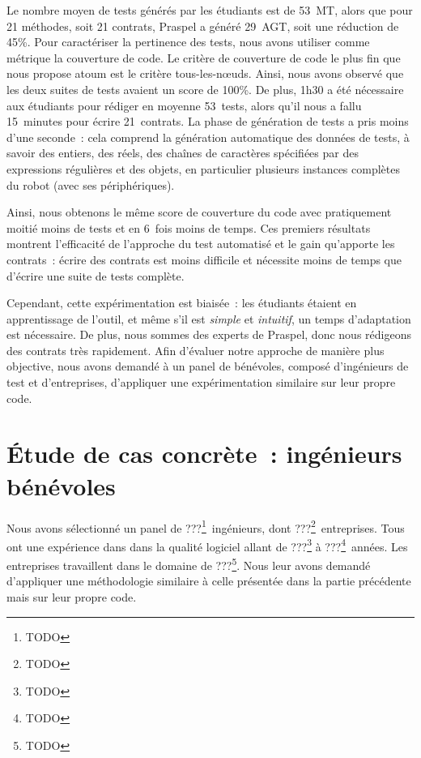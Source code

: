 Le nombre moyen de tests générés par les étudiants est de 53~MT, alors que pour
21 méthodes, soit 21 contrats, Praspel a généré 29~AGT, soit une réduction de
45\%. Pour caractériser la pertinence des tests, nous avons utiliser comme
métrique la couverture de code. Le critère de couverture de code le plus fin que
nous propose atoum est le critère tous-les-nœuds. Ainsi, nous avons observé que
les deux suites de tests avaient un score de 100\%. De plus, 1h30 a été
nécessaire aux étudiants pour rédiger en moyenne 53~tests, alors qu'il nous a
fallu 15~minutes pour écrire 21~contrats.  La phase de génération de tests a
pris moins d'une seconde~: cela comprend la génération automatique des données
de tests, à savoir des entiers, des réels, des chaînes de caractères spécifiées
par des expressions régulières et des objets, en particulier plusieurs instances
complètes du robot (avec ses périphériques).

Ainsi, nous obtenons le même score de couverture du code avec pratiquement
moitié moins de tests et en 6~fois moins de temps. Ces premiers résultats
montrent l'efficacité de l'approche du test automatisé et le gain qu'apporte les
contrats~: écrire des contrats est moins difficile et nécessite moins de temps
que d'écrire une suite de tests complète.

Cependant, cette expérimentation est biaisée~: les étudiants étaient en
apprentissage de l'outil, et même s'il est {\em simple} et {\em intuitif}, un
temps d'adaptation est nécessaire. De plus, nous sommes des experts de Praspel,
donc nous rédigeons des contrats très rapidement. Afin d'évaluer notre approche
de manière plus objective, nous avons demandé à un panel de bénévoles, composé
d'ingénieurs de test et d'entreprises, d'appliquer une expérimentation similaire
sur leur propre code.

\section{Étude de cas concrète~: ingénieurs bénévoles}
\label{section:experimentation:real}

Nous avons sélectionné un panel de ???\footnote{TODO}~ingénieurs, dont
???\footnote{TODO}~entreprises. Tous ont une expérience dans dans la
qualité logiciel allant de ???\footnote{TODO} à ???\footnote{TODO}~années. Les
entreprises travaillent dans le domaine de ???\footnote{TODO}. Nous leur avons
demandé d'appliquer une méthodologie similaire à celle présentée dans la partie
précédente mais sur leur propre code.

